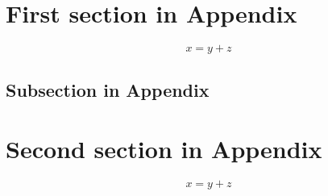 \documentclass[12pt]{../bppaper}
\begin{document}
\section{First section in Appendix}

\blindtext 
\begin{equation}
x = y + z
\end{equation}
\blindtext 

\subsection{Subsection in Appendix}

\blindtext 

\section{Second section in Appendix}

\blindtext 
\begin{equation}
x = y + z
\end{equation}
\blindtext 

\end{document}
